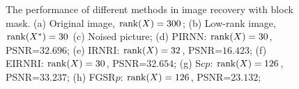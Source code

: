 \documentclass[twoside,11pt]{article}
\numberwithin{equation}{section}
\begin{document}
\begin{figure}[bhtp]
{    
  }
  \captionsetup{singlelinecheck=off, justification=raggedright}
  \caption{The performance of different methods in image recovery with block mask. 
  (a) Original image, ${\rm rank}(X) = 300$; 
  (b) Low-rank image, ${\rm rank}(X^{*}) = 30$
  (c) Noised picture; 
  (d) PIRNN:   ${\rm rank}(X) = 30$,  PSNR=$32.696$;
  (e) IRNRI:   ${\rm rank}(X) = 32$,  PSNR=$16.423$;
  (f) EIRNRI:  ${\rm rank}(X) = 30$,  PSNR=$32.654$;
  (g) Sc$p$:   ${\rm rank}(X) = 126$,  PSNR=$33.237$;
  (h) FGSR$p$: ${\rm rank}(X) = 126$,  PSNR=$23.132$;
  }
  \label{Relimg_R1}
\end{figure}
\end{document}
